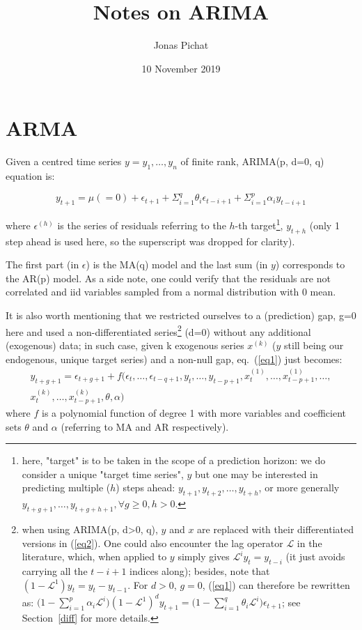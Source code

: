 \documentclass{article}
\begin{document}
\title{Notes on ARIMA}
\author{Jonas Pichat}
\date{10 November 2019}
\maketitle


\section{ARMA}

Given a centred time series $y=y_1, \ldots, y_n$ of finite rank, ARIMA(p, d=0, q) equation is:

\begin{equation}
  \label{eq1}
y_{t+1}=\mu(=0)+\epsilon_{t+1}+\Sigma_{i=1}^{q}\theta_{i}\epsilon_{t-i+1}+\Sigma_{i=1}^{p}\alpha_{i}y_{t-i+1} 
\end{equation}

where $\epsilon^{(h)}$ is the series of residuals referring to the $h$-th target\footnote{here, "target" is to be taken in the scope of a prediction horizon: we do consider a unique "target time series", $y$ but one may be interested in predicting multiple ($h$) steps ahead: $y_{t+1}, y_{t+2}, \dots, y_{t+h}$, or more generally $y_{t+g+1},\dots, y_{t+g+h+1}, \forall g\geq 0, h>0$.}, $y_{t+h}$ (only 1 step ahead is used here, so the superscript was dropped for clarity). 

The first part (in $\epsilon$) is the MA(q) model and the last sum (in $y$) corresponds to the AR(p) model. As a side note, one could verify that the residuals are not correlated and iid variables sampled from a normal distribution with 0 mean.

It is also worth mentioning that we restricted ourselves to a (prediction) gap, g=0 here and used a non-differentiated series\footnote{when using ARIMA(p, d>0, q), $y$ and $x$ are replaced with their differentiated versions in (\ref{eq2}). One could also encounter the lag operator $\mathcal{L}$ in the literature, which, when applied to $y$ simply gives $\mathcal{L}^iy_t=y_{t-i}$ (it just avoids carrying all the $t-i+1$ indices along); besides, note that $(1-\mathcal{L}^1)y_t=y_t-y_{t-1}$. For $d>0$, $g=0$, (\ref{eq1}) can therefore be rewritten as: $\big(1-\sum_{i=1}^p \alpha_i \mathcal{L}^i \big) (1-\mathcal{L}^1)^dy_{t+1} = \big(1-\sum_{i=1}^q \theta_i \mathcal{L}^i \big)\epsilon_{t+1}$; see Section~\ref{diff} for more details.} (d=0) without any additional (exogenous) data; in such case, given k exogenous series $x^{(k)}$ ($y$ still being our endogenous, unique target series) and a non-null gap, eq.~(\ref{eq1}) just becomes:
\begin{equation}
\begin{split}
\label{eq2}
y_{t+g+1} = \epsilon_{t+g+1} + f(\epsilon_{t}, \dots, \epsilon_{t-q+1}, y_{t},\dots, y_{t-p+1}, x^{(1)}_{t}, \dots, x^{(1)}_{t-p+1}, \dots, \\
x^{(k)}_{t}, \dots, x^{(k)}_{t-p+1}, \theta, \alpha)
\end{split}
\end{equation}
where $f$ is a polynomial function of degree 1 with more variables and coefficient sets $\theta$ and $\alpha$ (referring to MA and AR respectively).
\end{document}
